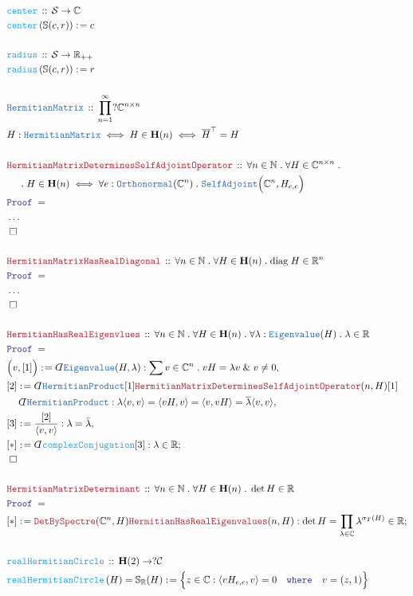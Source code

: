 \documentclass[12pt]{scrartcl}
\newcommand{\TYPE}[1]{\textcolor{NavyBlue}{\mathtt{#1}}}
\newcommand{\FUNC}[1]{\textcolor{Cerulean}{\mathtt{#1}}}
\newcommand{\LOGIC}[1]{\textcolor{Blue}{\mathtt{#1}}}
\newcommand{\THM}[1]{\textcolor{Maroon}{\mathtt{#1}}}
\renewcommand{\.}{\; . \;}
\newcommand{\de}{: \kern 0.1pc =}
\newcommand{\where}{\LOGIC{where}}
\newcommand{\Act}[1]{\left( #1 \right)}
\newcommand{\Theorem}[2]{& \THM{#1} \, :: \, #2 \\ & \Proof = \\ }
\newcommand{\DeclareType}[2]{& \TYPE{#1} \, :: \, #2 \\}
\newcommand{\DefineNamedType}[4]{& #1 : \TYPE{#2} \iff #3 \iff #4 \\}
\newcommand{\DeclareFunc}[2]{& \FUNC{#1} \, :: \, #2 \\}
\newcommand{\DefineFunc}[3]{&  \FUNC{#1}\Act{#2} \de #3 \\}
\newcommand{\DefineNamedFunc}[4]{&  \FUNC{#1}\Act{#2} = #3 \de #4 \\}
\newcommand{\NewLine}{\\ & \kern 1pc}
\newcommand{\Page}[1]{ \begin{align*} #1 \end{align*}   }
\newcommand{ \bd }{ \ByDef }
\newcommand{\NoProof}{ & \ldots \\ \EndProof}
\renewcommand{\And}{\; \& \;}
\newcommand{\Reals}{\mathbb{R} }
\newcommand{\Complex}{\mathbb{C}}
\newcommand{\Sphere}{\mathbb{S}}
\newcommand{\Nat}{\mathbb{N} }
\newcommand{\Say}[3]{& #1 \de #2 : #3, \\}
\newcommand{\Conclude}[3]{& #1 \de #2 : #3; \\}
\newcommand{\QED}{\; \square}
\newcommand{\EndProof}{& \QED \\}
\newcommand{\ByDef}{\rotatebox[origin=c]{-180}{$D$}}%
\newcommand{\Proof}{\LOGIC{Proof} \; }
\newcommand{\C}{\mathcal{C}}
\renewcommand{\S}{\mathcal{S}}
\newcommand{\Herm}{\mathbf{H}}
\begin{document}
\Page{
	\DeclareFunc{center}{\S \to \Complex}
	\DefineFunc{center}{\Sphere(c,r)}{c}
	\\
	\DeclareFunc{radius}{\S \to \Reals_{++}}
	\DefineFunc{radius}{\Sphere(c,r)}{r}
	\\
	\DeclareType{HermitianMatrix}{\prod^\infty_{n=1} ?\Complex^{n \times n}}
	\DefineNamedType{H}{HermitianMatrix}{H \in \Herm(n)}{\overline{H}^\top = H}
	\\
	\Theorem{HermitianMatrixDeterminesSelfAdjointOperator}
	{
		\forall n \in \Nat \. \forall H \in \Complex^{n \times n } \.  \NewLine \.
		H \in \Herm(n) \iff \forall e : \TYPE{Orthonormal}(\Complex^n) \. \TYPE{SelfAdjoint}\Big(\Complex^n , H_{e,e} \Big)
	}
	\NoProof
	\\
	\Theorem{HermitianMatrixHasRealDiagonal}
	{
		\forall n \in \Nat \. \forall H \in \Herm(n) \. \mathrm{diag}\; H \in \Reals^n
	}
	\NoProof
	\\
	\Theorem{HermitianHasRealEigenvlues}{\forall n \in \Nat\. \forall H \in \Herm(n) \.\forall \lambda : \TYPE{Eigenvalue}(H) \. \lambda \in \Reals}
	\Say{\Big( v, [1]\Big)}{\bd \TYPE{Eigenvalue}(H,\lambda)}{\sum v \in \Complex^n \. vH = \lambda v \And v \neq 0}
	\Say{[2]}{\bd \TYPE{HermitianProduct} [1] \THM{HermitianMatrixDeterminesSelfAdjointOperator}(n,H) [1] \NewLine \bd \TYPE{HermitianProduct}}
	{  \lambda \langle v, v \rangle   = \langle vH, v \rangle =  \langle v, vH \rangle  =  \overline{\lambda} \langle v,v \rangle}
	\Say{[3]}{\frac{[2]}{\langle v,v\rangle}}{\lambda = \bar \lambda}
	\Conclude{[*]}{\bd \FUNC{complexConjugation}[3]}{\lambda \in \Reals }
	\EndProof
	\\
	\Theorem{HermitianMatrixDeterminant}{\forall n \in \Nat \. \forall H \in \Herm(n) \. \det H \in \Reals}
	\Conclude{[*]}{\THM{DetBySpectre}(\Complex^n,H)\THM{HermitianHasRealEigenvalues}(n,H)}{\det H = \prod_{\lambda \in \Complex} \lambda^{\sigma_T(H)} \in \Reals}
	\\
	\DeclareFunc{realHermitianCircle}{\Herm(2) \to ?\C}
	\DefineNamedFunc{realHermitianCircle}{H}{\Sphere_\Reals(H)}{\Big\{ z \in \Complex  : \langle vH_{e,e}, v \rangle = 0 \quad \where \quad v = (z,1)  \Big\}}
}
\end{document}
